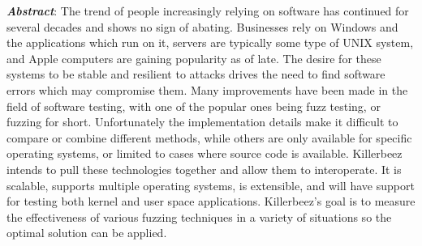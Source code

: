\textbf{\textit{Abstract}}:
The trend of people increasingly relying on software has continued for
several decades and shows no sign of abating. Businesses rely on Windows and
the applications which run on it, servers are typically some type of UNIX
system, and Apple computers are gaining popularity as of late. The desire
for these systems to be stable and resilient to attacks drives the need to find
software errors which may compromise them. Many improvements have been
made in the field of software testing, with one of the popular ones being fuzz
testing, or fuzzing for short.  Unfortunately the implementation details make
it difficult to compare or combine different methods, while others are only
available for specific operating systems, or limited to cases where source
code is available.  Killerbeez intends to pull these technologies together
and allow them to interoperate. It is scalable, supports multiple operating
systems, is extensible, and will have support for testing both kernel and
user space applications. Killerbeez's goal is to measure the effectiveness
of various fuzzing techniques in a variety of situations so the optimal
solution can be applied. 
